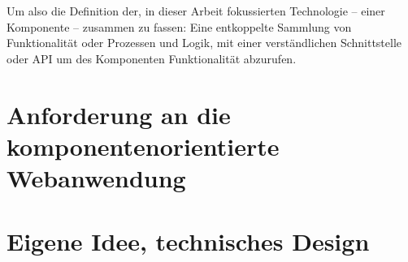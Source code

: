 Um also die Definition der, in dieser Arbeit fokussierten Technologie -- einer Komponente -- zusammen zu fassen: Eine entkoppelte Sammlung von Funktionalität oder Prozessen und Logik, mit einer verständlichen Schnittstelle oder API um des Komponenten Funktionalität abzurufen.

\section{Anforderung an die komponentenorientierte Webanwendung}

\section{Eigene Idee, technisches Design}
